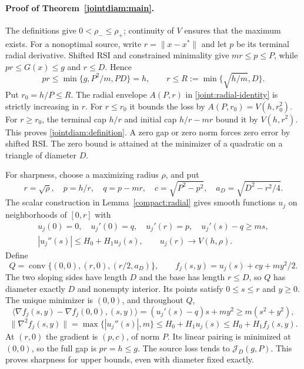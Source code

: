 \paragraph{Proof of Theorem~\ref{jointdiam:main}.}
The definitions give $0<\rho_-\le\rho_+$; continuity of $V$ ensures
that the maximum exists. For a nonoptimal source,
write $r=\|x-x^*\|$ and let $p$ be its terminal radial derivative.
Shifted RSI and constrained minimality give
$mr\le p\le P$, while $pr\le G(x)\le g$ and $r\le D$. Hence
\[
 pr\le\min\{g,P^2/m,PD\}=h,\qquad
 r\le R:=\min\{\sqrt{h/m},D\}.
\]
Put $r_0=h/P\le R$. The radial envelope $A(P,r)$ in
\eqref{joint:radial-identity} is strictly increasing in $r$.
For $r\le r_0$ it bounds the loss by
$A(P,r_0)=V(h,r_0^2)$. For $r\ge r_0$, the terminal cap $h/r$
and initial cap $h/r-mr$ bound it by $V(h,r^2)$. This proves
\eqref{jointdiam:definition}. A zero gap or zero norm forces zero
error by shifted RSI. The zero bound is attained at the minimizer
of a quadratic on a triangle of diameter $D$.

For sharpness, choose a maximizing radius $\rho$, and put
\[
 r=\sqrt\rho,\quad p=h/r,\quad q=p-mr,\quad
 c=\sqrt{P^2-p^2},\quad a_D=\sqrt{D^2-r^2/4}.
\]
The scalar construction in Lemma~\ref{compact:radial} gives
smooth functions $u_j$ on neighborhoods of $[0,r]$ with
\[
 \begin{gathered}
 u_j(0)=0,\quad u_j'(0)=q,\quad u_j'(r)=p,\quad
 u_j'(s)-q\ge ms,\\
 |u_j''(s)|\le H_0+H_1u_j(s),\qquad
 u_j(r)\longrightarrow V(h,\rho).
 \end{gathered}
\]
Define
\[
 Q=\operatorname{conv}\{(0,0),(r,0),(r/2,a_D)\},\qquad
 f_j(s,y)=u_j(s)+cy+my^2/2.
\]
The two sloping sides have length $D$ and the base has length
$r\le D$, so $Q$ has diameter exactly $D$ and nonempty interior.
Its points satisfy $0\le s\le r$ and $y\ge0$. The unique minimizer
is $(0,0)$, and throughout $Q$,
\[
 \langle\nabla f_j(s,y)-\nabla f_j(0,0),(s,y)\rangle
       =(u_j'(s)-q)s+my^2\ge m(s^2+y^2),
\]
\[
 \|\nabla^2f_j(s,y)\|
       =\max\{|u_j''(s)|,m\}
       \le H_0+H_1u_j(s)\le H_0+H_1f_j(s,y).
\]
At $(r,0)$ the gradient is $(p,c)$, of norm $P$. Its linear
pairing is minimized at $(0,0)$, so the full gap is $pr=h\le g$.
The source loss tends to $\mathcal J_D(g,P)$. This proves sharpness
for upper bounds, even with diameter fixed exactly.

